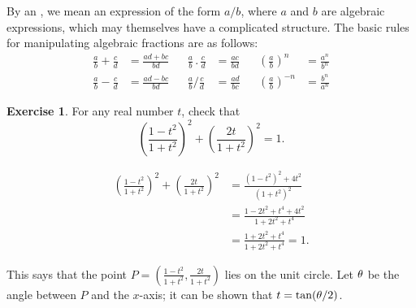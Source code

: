 \documentclass[a4paper]{book}
\theoremstyle{definition}
\newtheorem{exercise}[theorem]{Exercise}
\renewenvironment{solution}{\SolutionInline}{\endSolutionInline}
\begin{document}
By an , we mean an expression of the form
$a/b$, where $a$ and $b$ are algebraic expressions, which may
themselves have a complicated structure.  The basic rules for
manipulating algebraic fractions are as follows:
\[ \begin{array}{rlcrlcrl}
 \frac{a}{b} + \frac{c}{d} &= \frac{ad+bc}{bd} &&
 \frac{a}{b} \,.\, \frac{c}{d} &= \frac{ac}{bd} &&
 \left(\frac{a}{b}\right)^n &= \frac{a^n}{b^n} \\
 \frac{a}{b} - \frac{c}{d} &= \frac{ad-bc}{bd} &&
 \frac{a}{b} / \frac{c}{d} &= \frac{ad}{bc} &&
 \left(\frac{a}{b}\right)^{-n} &= \frac{b^n}{a^n}
\end{array} \]
\begin{exercise}
 For any real number $t$, check that
 \[ \left(\frac{1-t^2}{1+t^2}\right)^2 +
    \left(\frac{2t}{1+t^2}\right)^2 = 1.
 \]
\end{exercise}
\begin{solution}
 \begin{align*}
  \left(\frac{1-t^2}{1+t^2}\right)^2 +
    \left(\frac{2t}{1+t^2}\right)^2 &=
   \frac{(1-t^2)^2 + 4t^2}{(1+t^2)^2} \\
   &= \frac{1-2t^2+t^4 + 4t^2}{1+2t^2+t^4} \\
   &= \frac{1+2t^2+t^4}{1+2t^2+t^4} = 1.
 \end{align*}
\end{solution}
\begin{background}
 This says that the point
 $P=\left(\frac{1-t^2}{1+t^2},\frac{2t}{1+t^2}\right)$ lies on the
 unit circle.  Let $\theta$ be the angle between $P$ and the $x$-axis;
 it can be shown that $t=\tan(\theta/2)$.
\end{background}
\end{document}
